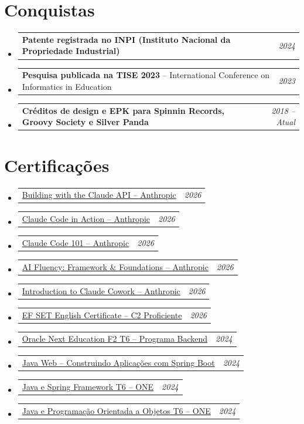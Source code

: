 \documentclass[a4paper,11pt]{article}
\makeatletter
\newcommand{\resumePOR}[3]{
\vspace{0.5mm}\item
    \begin{tabular*}{0.97\textwidth}[t]{l@{\extracolsep{\fill}}r}
        \textbf{#1}\hspace{0.3mm}#2 & \textit{\small{#3}}
    \end{tabular*}
    \vspace{-2mm}
}
\newcommand{\resumeSubHeadingListStart}{\begin{itemize}[leftmargin=*,labelsep=0mm]}
\newcommand{\resumeSubHeadingListEnd}{\end{itemize}\vspace{2mm}}
\makeatother
\begin{document}
\section{\textbf{Conquistas}}
 \vspace{-0.4mm}
 \resumeSubHeadingListStart
 \resumePOR{Patente registrada no INPI (Instituto Nacional da Propriedade Industrial)}{}{2024}
 \resumePOR{Pesquisa publicada na TISE 2023}{ -- International Conference on Informatics in Education}{2023}
 \resumePOR{Créditos de design e EPK para Spinnin Records, Groovy Society e Silver Panda}{}{2018 -- Atual}
 \resumeSubHeadingListEnd
 \vspace{-5mm}

\section{\textbf{Certificações}}
\vspace{-0.4mm}
\resumeSubHeadingListStart
    \resumePOR {}
        {\href{https://verify.skilljar.com/c/bfrsmrfj3bzt}{Building with the Claude API -- Anthropic}}
        {2026}
    \resumePOR {}
        {\href{https://verify.skilljar.com/c/xjs8afiak8vv}{Claude Code in Action -- Anthropic}}
        {2026}
    \resumePOR {}
        {\href{https://verify.skilljar.com/c/6jrkvs9p54u9}{Claude Code 101 -- Anthropic}}
        {2026}
    \resumePOR {}
        {\href{https://verify.skilljar.com/c/xeqrcwuynqib}{AI Fluency: Framework \& Foundations -- Anthropic}}
        {2026}
    \resumePOR {}
        {\href{https://verify.skilljar.com/c/s5nvotjcapt6}{Introduction to Claude Cowork -- Anthropic}}
        {2026}
    \resumePOR {}
        {\href{https://cert.efset.org/en/pFP3vr}{EF SET English Certificate -- C2 Proficiente}}
        {2026}
    \resumePOR {}
        {\href{https://cursos.alura.com.br/program/certificate/3fcc6b19-b023-4a20-b202-ef4bcffd0591?lang}{Oracle Next Education F2 T6 -- Programa Backend}}
        {2024}
    \resumePOR {}
        {\href{https://cursos.alura.com.br/user/eumoitinho/degree-java-web-spring-boot-596328/certificate}{Java Web -- Construindo Aplicações com Spring Boot}}
        {2024}
    \resumePOR {}
        {\href{https://cursos.alura.com.br/user/eumoitinho/degree-spring-framework-turma6-one-733547/certificate}{Java e Spring Framework T6 -- ONE}}
        {2024}
    \resumePOR {}
        {\href{https://cursos.alura.com.br/user/eumoitinho/degree-java-turma6-one-733558/certificate}{Java e Programação Orientada a Objetos T6 -- ONE}}
        {2024}
\resumeSubHeadingListEnd
\vspace{-5mm}
\end{document}
